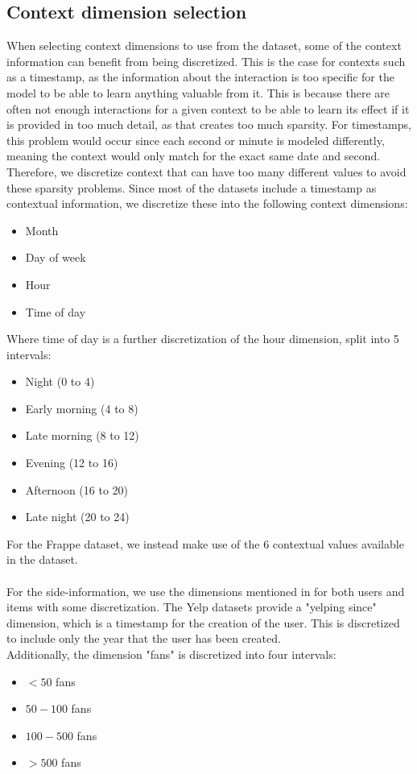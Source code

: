 \subsection{Context dimension selection}
When selecting context dimensions to use from the dataset, some of the context information can benefit from being discretized.
This is the case for contexts such as a timestamp, as the information about the interaction is too specific for the model to be able to learn anything valuable from it.
This is because there are often not enough interactions for a given context to be able to learn its effect if it is provided in too much detail, as that creates too much sparsity. 	 
For timestamps, this problem would occur since each second or minute is modeled differently, meaning the context would only match for the exact same date and second.
Therefore, we discretize context that can have too many different values to avoid these sparsity problems.
Since most of the datasets include a timestamp as contextual information, we discretize these into the following context dimensions:
\begin{itemize}
    \item Month
    \item Day of week
    \item Hour
    \item Time of day
\end{itemize}
Where time of day is a further discretization of the hour dimension, split into 5 intervals:
\begin{itemize}
    \item Night (0 to 4)
    \item Early morning (4 to 8)
    \item Late morning (8 to 12)
    \item Evening (12 to 16)
    \item Afternoon (16 to 20)
    \item Late night (20 to 24)
\end{itemize}
For the Frappe dataset, we instead make use of the 6 contextual values available in the dataset.
\\\\
For the side-information, we use the dimensions mentioned in  for both users and items with some discretization.
The Yelp datasets provide a "yelping since" dimension, which is a timestamp for the creation of the user.
This is discretized to include only the year that the user has been created.
\\
Additionally, the dimension "fans" is discretized into four intervals:
\begin{itemize}
    \item $< 50$ fans
    \item $50 - 100$ fans
    \item $100-500$ fans
    \item $> 500$ fans
\end{itemize}

